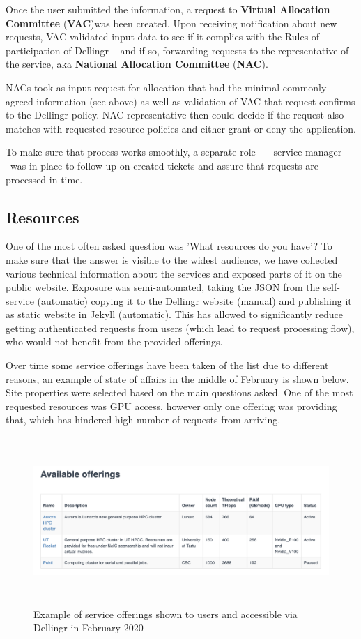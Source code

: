 \documentclass{article}
\begin{document}
Once the user submitted the information, a request to \textbf{Virtual Allocation Committee} (\textbf{VAC})was been created. Upon receiving notification about new requests, VAC validated input data to see if it complies with the Rules of participation of Dellingr -- and if so, forwarding requests to the representative of the service, aka \textbf{National Allocation Committee} (\textbf{NAC}).

NACs took as input request for allocation that had the minimal commonly agreed information (see above) as well as validation of VAC that request confirms to the Dellingr policy. NAC representative then could decide if the request also matches with requested resource policies and either grant or deny the application. 

To make sure that process works smoothly, a separate role –– service manager –– was in place to follow up on created tickets and assure that requests are processed in time.

\subsection{Resources}

One of the most often asked question was 'What resources do you have'? To make sure that the answer is visible to the widest audience, we have collected various technical information about the services and exposed parts of it on the public website. Exposure was semi-automated, taking the JSON from the self-service (automatic) copying it to the Dellingr website (manual) and publishing it as static website in Jekyll (automatic). This has allowed to significantly reduce getting authenticated requests from users (which lead to request processing flow), who would not benefit from the provided offerings.  

Over time some service offerings have been taken of the list due to different reasons, an example of state of affairs in the middle of February is shown below. Site properties were selected based on the main questions asked. One of the most requested resources was GPU access, however only one offering was providing that, which has hindered high number of requests from arriving.


\begin{figure}
\centering
\includegraphics[height=180pt]{Dellingr-list-of-resource.png}
\caption{Example of service offerings shown to users and accessible via Dellingr in February 2020}
\end{figure}
\end{document}
